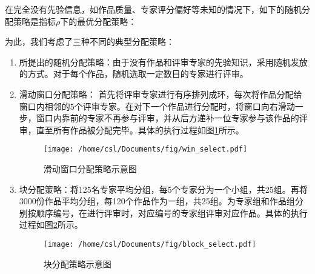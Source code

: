 \documentclass[bwprint]{gmcmthesis}
\begin{document}
在完全没有先验信息，如作品质量、专家评分偏好等未知的情况下，如下的随机分配策略是指标$\rho$下的最优分配策略：
\begin{algorithm}[h]
	\caption{}
	\LinesNumbered 
\end{algorithm}

为此，我们考虑了三种不同的典型分配策略：
	\begin{enumerate}
		\item 所提出的随机分配策略：由于没有作品和评审专家的先验知识，采用随机发放的方式。对于每个作品，随机选取一定数目的专家进行评审。
		\item 滑动窗口分配策略：
		首先将评审专家进行有序排列成环，每次将作品分配给窗口内相邻的$5$个评审专家。在对下一个作品进行分配时，将窗口向右滑动一步，窗口内靠前的专家不再参与评审，并从后方递补一位专家参与该作品的评审，直至所有作品被分配完毕。具体的执行过程如图\ref{fig:滑动窗口分配策略示意图}所示。
		\begin{figure}[h]
			\centering
			\texttt{[image: /home/csl/Documents/fig/win\_select.pdf]}
			\caption{\normf 滑动窗口分配策略示意图}
			\label{fig:滑动窗口分配策略示意图}
		\end{figure}
	
		\item 块分配策略：将125名专家平均分组，每5个专家分为一个小组，共25组。再将3000份作品平均分组，每120个作品作为一组，共25组。为专家组和作品组分别按顺序编号，在进行评审时，对应编号的专家组评审对应作品。具体的执行过程如图\ref{fig:块分配策略示意图}所示。
	\begin{figure}[h]
			\centering
			\texttt{[image: /home/csl/Documents/fig/block\_select.pdf]}
			\caption{\normf 块分配策略示意图}
			\label{fig:块分配策略示意图}
		\end{figure}
	\end{enumerate}
\end{document}

